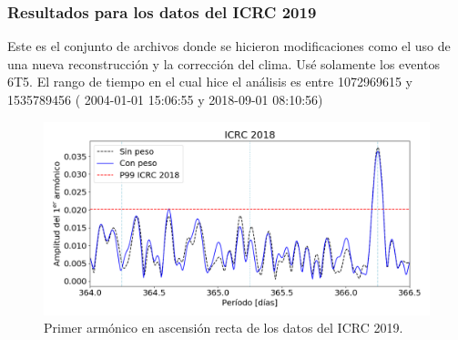       \subsubsection{Resultados para los datos del ICRC 2019}
      
      Este es el conjunto de archivos donde se hicieron modificaciones como el uso de una nueva reconstrucción y la corrección del clima. Usé solamente los eventos 6T5. El rango de tiempo en el cual hice  el análisis es entre 1072969615 y 1535789456 ( 2004-01-01 15:06:55 y   2018-09-01 08:10:56)

      \begin{figure}[H]
        \centering
        \includegraphics[width=\textwidth]{../0_Introduccion/ICRC/ICRC2019_Eraw_Eraw_hex.png}
        \caption{Primer armónico en ascensión recta de los datos del ICRC 2019.} \label{fig:8EeV_con_peso_ICRC2019}
      \end{figure}


      
